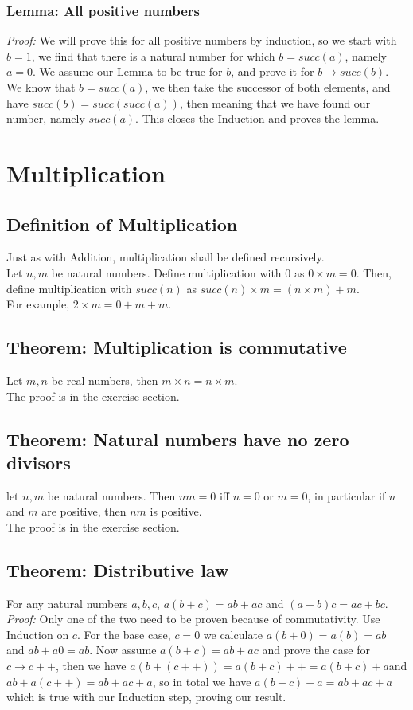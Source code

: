 \documentclass[]{scrbook}
\begin{document}
\subsubsection*{Lemma: All positive numbers}
\textit{Proof:} We will prove this for all positive numbers by induction, so we start with $b = 1$, we find that there is a natural number for which $b = succ(a)$, namely $a = 0$. We assume our Lemma to be true for $b$, and prove it for $b\rightarrow succ(b)$. We know that $b = succ(a)$, we then take the successor of both elements, and have $succ(b) = succ(succ(a))$, then meaning that we have found our number, namely $succ(a)$. This closes the Induction and proves the lemma.

\section{Multiplication}

\subsection{Definition of Multiplication}
Just as with Addition, multiplication shall be defined recursively.\\
Let $n, m$ be natural numbers. Define multiplication with 0 as $0 \times m = 0$. Then, define multiplication with $succ(n)$ as $succ(n) \times m = (n \times m) + m$.\\
For example, $2 \times m = 0 + m + m$.

\subsection{Theorem: Multiplication is commutative}
Let $m,n$ be real numbers, then $m\times n = n\times m$.\\
The proof is in the exercise section.

\subsection{Theorem: Natural numbers have no zero divisors}
let $n,m$ be natural numbers. Then $n m = 0$ iff $n = 0$ or $m = 0$, in particular if $n$ and $m$ are positive, then $nm$ is positive.\\
The proof is in the exercise section.

\subsection{Theorem: Distributive law}
For any natural numbers $a,b,c$, $a(b+c) = ab + ac$ and $(a+b)c = ac+bc$.\\
\textit{Proof:} Only one of the two need to be proven because of commutativity. Use Induction on $c$. For the base case, $c=0$ we calculate $a(b+0) = a(b) = ab$ and $ab + a0 = ab$. Now assume $a(b+c) = ab + ac$ and prove the case for $c\rightarrow c++$, then we have $a(b+(c++)) = a(b+c)++ = a(b+c) + a$and $ab + a(c++) = ab + ac + a$, so in total we have $a(b+c) + a = ab + ac + a$ which is true with our Induction step, proving our result.
\end{document}
